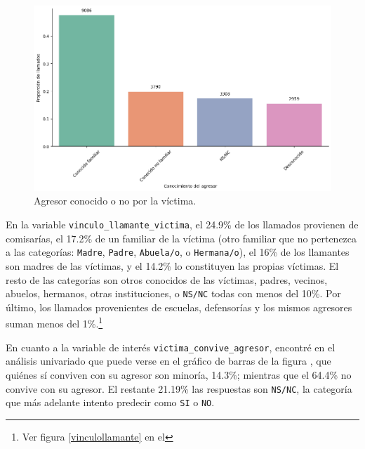 \documentclass[10 pt]{article}
\begin{document}
    \begin{figure}[H]
        \begin{center}
        \includegraphics[scale=.5]{images/latex_agresor_conocido_no.png}
        \caption{Agresor conocido o no por la víctima.}
        \label{conocidodesconocido}
        \end{center}
        \end{figure}




 En la variable \texttt{vinculo\_llamante\_victima}, el 24.9\% de los llamados provienen de comisarías, el 17.2\% de un familiar de la víctima (otro familiar que no pertenezca a las categorías: \texttt{Madre}, \texttt{Padre}, \texttt{Abuela/o}, o \texttt{Hermana/o}), el 16\% de los llamantes son madres de las víctimas, y el 14.2\% lo constituyen las propias víctimas. El resto de las categorías son otros conocidos de las víctimas, padres, vecinos, abuelos, hermanos, otras instituciones, o \texttt{NS/NC} todas con menos del 10\%. Por último, los llamados provenientes de escuelas, defensorías y los mismos agresores suman menos del 1\%.\footnote{Ver figura \ref{vinculollamante} en el }



En cuanto a la variable de interés \texttt{victima\_convive\_agresor}, encontré en el análisis univariado que puede verse en el gráfico de barras de la figura , que quiénes sí conviven con su agresor son minoría, 14.3\%; mientras que el 64.4\% no convive con su agresor. El restante 21.19\% las respuestas son \texttt{NS/NC}, la categoría que más adelante intento predecir como \texttt{SI} o \texttt{NO}.  
\end{document}

